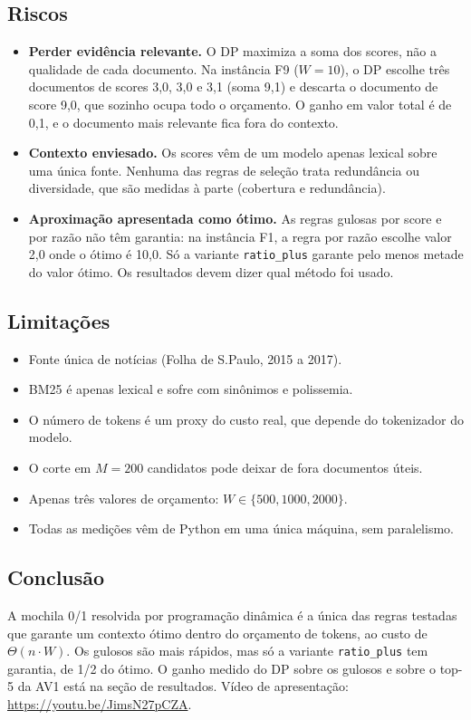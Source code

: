 \subsection{Riscos}
\begin{itemize}
  \item \textbf{Perder evidência relevante.} O DP maximiza a soma dos scores, não a qualidade de cada documento. Na instância F9 ($W = 10$), o DP escolhe três documentos de scores 3,0, 3,0 e 3,1 (soma 9,1) e descarta o documento de score 9,0, que sozinho ocupa todo o orçamento. O ganho em valor total é de 0,1, e o documento mais relevante fica fora do contexto.
  \item \textbf{Contexto enviesado.} Os scores vêm de um modelo apenas lexical sobre uma única fonte. Nenhuma das regras de seleção trata redundância ou diversidade, que são medidas à parte (cobertura e redundância).
  \item \textbf{Aproximação apresentada como ótimo.} As regras gulosas por score e por razão não têm garantia: na instância F1, a regra por razão escolhe valor 2,0 onde o ótimo é 10,0. Só a variante \texttt{ratio\_plus} garante pelo menos metade do valor ótimo. Os resultados devem dizer qual método foi usado.
\end{itemize}

\subsection{Limitações}
\begin{itemize}
  \item Fonte única de notícias (Folha de S.Paulo, 2015 a 2017).
  \item BM25 é apenas lexical e sofre com sinônimos e polissemia.
  \item O número de tokens é um proxy do custo real, que depende do tokenizador do modelo.
  \item O corte em $M = 200$ candidatos pode deixar de fora documentos úteis.
  \item Apenas três valores de orçamento: $W \in \{500, 1000, 2000\}$.
  \item Todas as medições vêm de Python em uma única máquina, sem paralelismo.
\end{itemize}

\subsection{Conclusão}
A mochila 0/1 resolvida por programação dinâmica é a única das regras testadas que garante um contexto ótimo dentro do orçamento de tokens, ao custo de $\Theta(n \cdot W)$. Os gulosos são mais rápidos, mas só a variante \texttt{ratio\_plus} tem garantia, de 1/2 do ótimo. O ganho medido do DP sobre os gulosos e sobre o top-5 da AV1 está na seção de resultados. Vídeo de apresentação: \url{https://youtu.be/JimsN27pCZA}.

